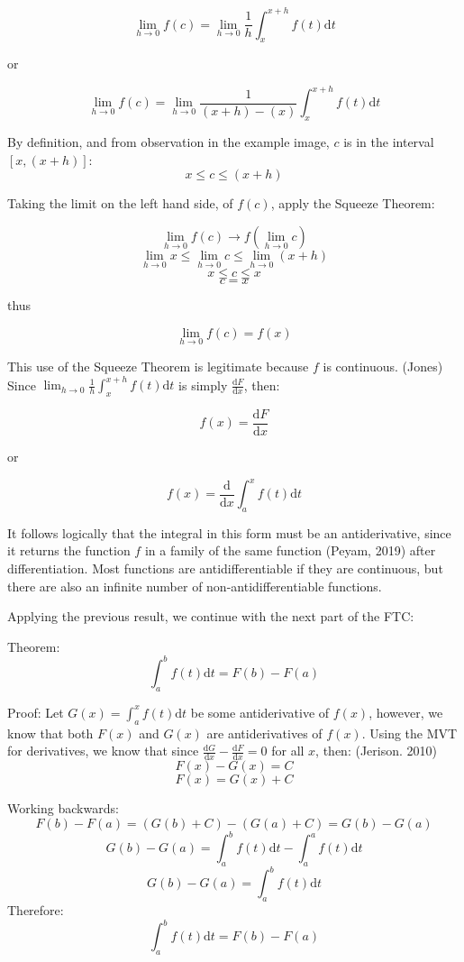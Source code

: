 \documentclass[11pt]{article}
\begin{document}
$$\lim_{h\to{0}}f(c) = \lim_{h\to{0}}{\frac{1}{h}\int_{x}^{x+h}{f(t)\mathrm{d}t}}$$
\begin{center}
or
\end{center}
$$\lim_{h\to{0}}f(c) = \lim_{h\to{0}}{\frac{1}{(x+h)-(x)}\int_{x}^{x+h}{f(t)\mathrm{d}t}}$$

By definition, and from observation in the example image, $c$ is in the interval $[x,(x+h)]$:
$$x\leq c\leq (x+h)$$

Taking the limit on the left hand side, of $f(c)$, apply the Squeeze Theorem:

$$\lim_{h\to 0}f(c)\to f(\lim_{h\to 0} c)$$
$$\lim_{h\to 0} x\leq \lim_{h\to 0} c\leq \lim_{h\to 0} (x+h)$$
$$x\leq c\leq x$$
$$c = x$$
\begin{center}
thus
\end{center}
$$\lim_{h\to 0}f(c) = f(x)$$

This use of the Squeeze Theorem is legitimate because $f$ is continuous. (Jones) Since $\displaystyle{\lim_{h\to{0}}{\frac{1}{h}\int_{x}^{x+h}{f(t)\mathrm{d}t}}}$  is simply $\displaystyle{\frac{\mathrm{d}F}{\mathrm{d}x}}$, then:

$$f(x) = \frac{\mathrm{d}F}{\mathrm{d}x}$$
\begin{center}
or
\end{center}
$$f(x) = \frac{\mathrm{d}}{\mathrm{d}x}\int_{a}^{x}{f(t)\mathrm{d}t}$$

It follows logically that the integral in this form must be an antiderivative, since it returns the function $f$ in a family of the same function (Peyam, 2019) after differentiation. Most functions are antidifferentiable if they are continuous, but there are also an infinite number of non-antidifferentiable functions.

Applying the previous result, we continue with the next part of the FTC:

Theorem:
$$\int_{a}^{b}f(t)\mathrm{d}t = F(b) - F(a)$$

Proof: Let $\displaystyle{G(x) = \int_{a}^{x}f(t)\mathrm{d}t}$ be some antiderivative of $f(x)$, however, we know that both $F(x)$ and $G(x)$ are antiderivatives of $f(x)$. Using the MVT for derivatives, we know that since $\displaystyle{\frac{\mathrm{d}G}{\mathrm{d}x}-\frac{\mathrm{d}F}{\mathrm{d}x}}=0$ for all $x$, then: (Jerison. 2010)
$$F(x)-G(x)=C$$
$$F(x)=G(x)+C$$

Working backwards:
$$F(b)-F(a) = (G(b)+C) - (G(a)+C) = G(b)-G(a)$$
$$G(b) - G(a) = \int_{a}^{b}f(t)\mathrm{d}t - \int_{a}^{a}f(t)\mathrm{d}t$$
$$G(b) - G(a) = \int_{a}^{b}f(t)\mathrm{d}t$$
Therefore:
$$\int_{a}^{b}f(t)\mathrm{d}t = F(b) - F(a)$$
\end{document}
